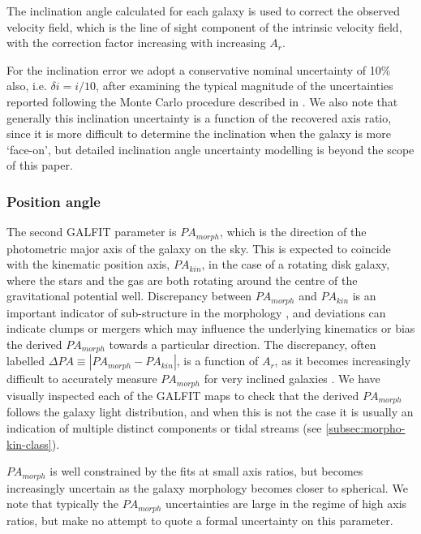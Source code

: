 \documentclass[fleqn,usenatbib]{mn2e}
\begin{document}
The inclination angle calculated for each galaxy is used to correct the observed velocity field, which is the line of sight component of the intrinsic velocity field, with the correction factor increasing with increasing $A_{r}$.

For the inclination error we adopt a conservative nominal uncertainty of 10$\%$ also, i.e. $\delta i = i / 10$, after examining the typical magnitude of the uncertainties reported following the Monte Carlo procedure described in \cite{Epinat2012}.
We also note that generally this inclination uncertainty is a function of the recovered axis ratio, since it is more difficult to determine the inclination when the galaxy is more `face-on', but detailed inclination angle uncertainty modelling is beyond the scope of this paper.

\subsubsection{Position angle}\label{subsubsection:position_angle}
The second GALFIT parameter is $PA_{morph}$, which is the direction of the photometric major axis of the galaxy on the sky.
This is expected to coincide with the kinematic position axis, $PA_{kin}$, in the case of a rotating disk galaxy, where the stars and the gas are both rotating around the centre of the gravitational potential well.
Discrepancy between $PA_{morph}$ and $PA_{kin}$ is an important indicator of sub-structure in the morphology \citep[e.g.][]{Queyrel2012,Wisnioski2015,Rodrigues2016}, and deviations can indicate clumps or mergers which may influence the underlying kinematics or bias the derived $PA_{morph}$ towards a particular direction. 
The discrepancy, often labelled $\Delta PA \equiv |PA_{morph} - PA_{kin}|$, is a function of $A_{r}$, as it becomes increasingly difficult to accurately measure $PA_{morph}$ for very inclined galaxies \citep[e.g.][]{Wisnioski2015,Harrison2017}.
We have visually inspected each of the GALFIT maps to check that the derived $PA_{morph}$ follows the galaxy light distribution, and when this is not the case it is usually an indication of multiple distinct components or tidal streams (see \cref{subsec:morpho-kin-class}).

$PA_{morph}$ is well constrained by the fits at small axis ratios, but becomes increasingly uncertain as the galaxy morphology becomes closer to spherical.
We note that typically the $PA_{morph}$ uncertainties are large in the regime of high axis ratios, but make no attempt to quote a formal uncertainty on this parameter.
\end{document}
